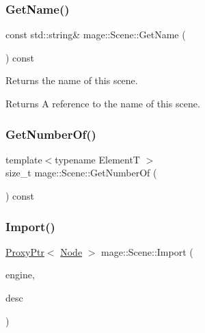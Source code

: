 \mbox{\label{classmage_1_1_scene_a4ba4e45e54935fddd63638664e7b0f2e}} 
\subsubsection{\texorpdfstring{Get\+Name()}{GetName()}}
{\footnotesize\ttfamily const std\+::string\& mage\+::\+Scene\+::\+Get\+Name (\begin{DoxyParamCaption}{ }\end{DoxyParamCaption}) const\hspace{0.3cm}{\ttfamily [noexcept]}}

Returns the name of this scene.

\begin{DoxyReturn}{Returns}
A reference to the name of this scene. 
\end{DoxyReturn}
\mbox{\label{classmage_1_1_scene_a308480749d009dad3a39333fd0c59f2a}} 
\subsubsection{\texorpdfstring{Get\+Number\+Of()}{GetNumberOf()}}
{\footnotesize\ttfamily template$<$typename ElementT $>$ \\
size\+\_\+t mage\+::\+Scene\+::\+Get\+Number\+Of (\begin{DoxyParamCaption}{ }\end{DoxyParamCaption}) const\hspace{0.3cm}{\ttfamily [noexcept]}}

\mbox{\label{classmage_1_1_scene_a03490fe422fdfa110a6d3b58c31d1bb4}} 
\subsubsection{\texorpdfstring{Import()}{Import()}\hspace{0.1cm}{\footnotesize\ttfamily [1/2]}}
{\footnotesize\ttfamily \mbox{\hyperlink{classmage_1_1_proxy_ptr}{Proxy\+Ptr}}$<$ \mbox{\hyperlink{classmage_1_1_node}{Node}} $>$ mage\+::\+Scene\+::\+Import (\begin{DoxyParamCaption}\item[{\mbox{\hyperlink{classmage_1_1_engine}{Engine}} \&}]{engine,  }\item[{const \mbox{\hyperlink{classmage_1_1rendering_1_1_model_descriptor}{rendering\+::\+Model\+Descriptor}} \&}]{desc }\end{DoxyParamCaption})}

